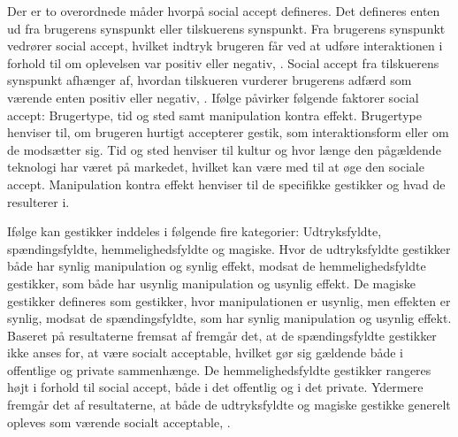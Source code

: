 Der er to overordnede måder hvorpå social accept defineres. Det defineres enten ud fra brugerens synspunkt eller tilskuerens synspunkt. Fra brugerens synspunkt vedrører social accept, hvilket indtryk brugeren får ved at udføre interaktionen i forhold til om oplevelsen var positiv eller negativ, \parencite[s. 276]{PDF:WouldYouDoThat}. Social accept fra tilskuerens synspunkt afhænger af, hvordan tilskueren vurderer brugerens adfærd som værende enten positiv eller negativ, \parencite[s. 276]{PDF:WouldYouDoThat}. Ifølge \textcite[s. 276]{PDF:WouldYouDoThat} påvirker følgende faktorer social accept: Brugertype, tid og sted samt manipulation kontra effekt. Brugertype henviser til, om brugeren hurtigt accepterer gestik, som interaktionsform eller om de modsætter sig. Tid og sted henviser til kultur og hvor længe den pågældende teknologi har været på markedet, hvilket kan være med til at øge den sociale accept. Manipulation kontra effekt henviser til de specifikke gestikker og hvad de resulterer i.

Ifølge \textcite[s. 276]{PDF:WouldYouDoThat} kan gestikker inddeles i følgende fire kategorier: Udtryksfyldte, spændingsfyldte, hemmelighedsfyldte og magiske. Hvor de udtryksfyldte gestikker både har synlig manipulation og synlig effekt, modsat de hemmelighedsfyldte gestikker, som både har usynlig manipulation og usynlig effekt. De magiske gestikker defineres som gestikker, hvor manipulationen er usynlig, men effekten er synlig, modsat de spændingsfyldte, som har synlig manipulation og usynlig effekt. Baseret på resultaterne fremsat af \textcite[s. 277]{PDF:WouldYouDoThat} fremgår det, at de spændingsfyldte gestikker ikke anses for, at være socialt acceptable, hvilket gør sig gældende både i offentlige og private sammenhænge. De hemmelighedsfyldte gestikker rangeres højt i forhold til social accept, både i det offentlig og i det private. Ydermere fremgår det af resultaterne, at både de udtryksfyldte og magiske gestikke generelt opleves som værende socialt acceptable, \parencite[s. 277]{PDF:WouldYouDoThat}. 

